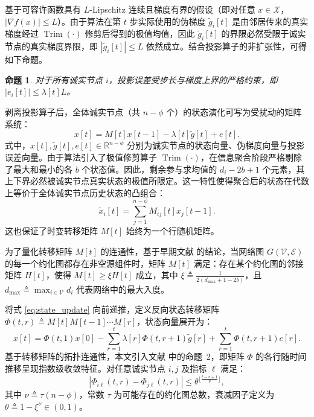 \documentclass[12pt,hyperref,a4paper,UTF8]{ctexart}
\newtheorem{proposition}{命题}[section]
\numberwithin{equation}{section}
\numberwithin{figure}{section}
\numberwithin{table}{section}
\begin{document}
基于可容许函数具有 $L$-Lipschitz 连续且梯度有界的假设（即对任意 $x \in \mathcal{X}$，$|\nabla f(x)| \le L$）。由于算法在第 $t$ 步实际使用的伪梯度 $\tilde{g}_i[t]$ 是由邻居传来的真实梯度经过 $\operatorname{Trim}(\cdot)$ 修剪后得到的极值均值，因此 $\tilde{g}_i[t]$ 的界限必然受限于诚实节点的真实梯度界限，即 $|\tilde{g}_i[t]| \le L$ 依然成立。结合投影算子的非扩张性，可得如下命题。

\begin{proposition}\label{prop:1}
    对于所有诚实节点 $i$，投影误差受步长与梯度上界的严格约束，即 $|e_i[t]| \le \lambda[t]L$。
\end{proposition}

剥离投影算子后，全体诚实节点（共 $n-\phi$ 个）的状态演化可写为受扰动的矩阵系统：
\begin{equation}
    \label{eq:state_update}
    x[t] = M[t]x[t-1] - \lambda[t]\tilde{g}[t] + e[t].
\end{equation}
式中，$x[t], \tilde{g}[t], e[t] \in \mathbb{R}^{n-\phi}$ 分别为诚实节点的状态向量、伪梯度向量与投影误差向量。由于算法引入了极值修剪算子 $\operatorname{Trim}(\cdot)$，在信息聚合阶段严格剔除了最大和最小的各 $b$ 个状态值。因此，剩余参与求均值的 $d_i - 2b + 1$ 个元素，其上下界必然被诚实节点真实状态的极值所限定。这一特性使得聚合后的状态在代数上等价于全体诚实节点历史状态的凸组合：
\begin{equation} \label{eq:convex_comb}
    \tilde{x}_i[t] = \sum_{j=1}^{n-\phi} M_{ij}[t]x_j[t-1].
\end{equation}
这也保证了时变转移矩阵 $M[t]$ 始终为一个行随机矩阵。

为了量化转移矩阵 $M[t]$ 的连通性，基于早期文献 \cite{vaidya2012iterative} 的结论，当网络图 $G(\mathcal{V}, \mathcal{E})$ 的每一个约化图都存在非空源组件时，矩阵 $M[t]$ 满足：存在某个约化图的邻接矩阵 $H[t]$，使得 $M[t] \ge \xi H[t]$ 成立，其中 $\xi \triangleq \frac{1}{2(d_{\max} + 1 - 2b)}$，且 $d_{\max} \triangleq \max_{i \in \mathcal{V}}d_i$ 代表网络中的最大入度。

将式 \eqref{eq:state_update} 向前递推，定义反向状态转移矩阵 $\Phi(t, r) \triangleq M[t]M[t-1] \cdots M[r]$，状态向量展开为：
\begin{equation} \label{eq:expansion}
    x[t] = \Phi(t, 1)x[0] - \sum_{r=1}^t \lambda[r]\Phi(t, r+1)\tilde{g}[r] + \sum_{r=1}^t \Phi(t, r+1)e[r].
\end{equation}
基于转移矩阵的拓扑连通性，本文引入文献 \cite{tseng2015fault} 中的命题~2，即矩阵 $\Phi$ 的各行随时间推移呈现指数级收敛特征。对任意诚实节点 $i, j$ 及指标 $\ell$ 满足：
\begin{equation}
    |\Phi_{i\ell}(t, r) - \Phi_{j\ell}(t, r)| \le \theta^{\lfloor \frac{t-r+1}{\nu} \rfloor},
\end{equation}
其中 $\nu \triangleq \tau(n-\phi)$，常数 $\tau$ 为可能存在的约化图总数，衰减因子定义为 $\theta \triangleq 1 - \xi^\nu \in (0, 1)$。
\end{document}
